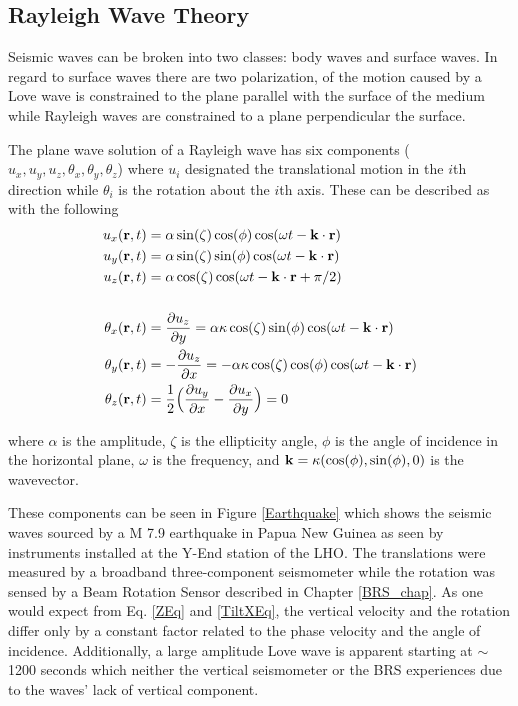 \documentclass [12pt, proquest]{uwthesis}[2019]
\begin{document}
\subsection{Rayleigh Wave Theory}

Seismic waves can be broken into two classes: body waves and surface waves. In regard to surface waves there are two polarization, of the motion caused by a Love wave is constrained to the plane parallel with the surface of the medium while Rayleigh waves are constrained to a plane perpendicular the surface. 

The plane wave solution of a Rayleigh wave has six components ($u_x, u_y, u_z, \theta_x, \theta_y, \theta_z$) where $u_i$ designated the translational motion in the $i$th direction while $\theta_i$ is the rotation about the $i$th axis.
These can be described as with the following \cite{seismic}
\begin{align}
u_x({\bf r} ,t)&=\alpha \sin(\zeta) \cos(\phi) \cos(\omega t-{\bf k}\cdot{\bf r})\label{XEq}\\
u_y({\bf r} ,t)&=\alpha \sin(\zeta) \sin(\phi) \cos(\omega t-{\bf k}\cdot{\bf r})\\
u_z({\bf r} ,t)&=\alpha \cos(\zeta) \cos(\omega t-{\bf k}\cdot{\bf r}+\pi/2)\label{ZEq}\\
\notag \\
\theta_x({\bf r} ,t)&=\frac{\partial u_z}{\partial y}=\alpha \kappa \cos(\zeta) \sin(\phi) \cos(\omega t-{\bf k}\cdot{\bf r})\label{TiltXEq}\\
\theta_y({\bf r} ,t)&=-\frac{\partial u_z}{\partial x}=-\alpha \kappa \cos(\zeta) \cos(\phi) \cos(\omega t-{\bf k}\cdot{\bf r})\\
\theta_z({\bf r} ,t)&=\frac{1}{2}\Big(\frac{\partial u_y}{\partial x}-\frac{\partial u_x}{\partial y}\Big)=0
\end{align}

where $\alpha$ is the amplitude, $\zeta$ is the ellipticity angle, $\phi$ is the angle of incidence in the horizontal plane, $\omega$ is the frequency, and $\bf{k}=\kappa (\cos(\phi),\sin(\phi),\text{0})$ is the wavevector.

These components can be seen in Figure \ref{Earthquake} which shows the seismic waves sourced by a M 7.9 earthquake in Papua New Guinea as seen by instruments installed at the Y-End station of the LHO. The translations were measured by a broadband three-component seismometer while the rotation was sensed by a Beam Rotation Sensor described in Chapter \ref{BRS_chap}. As one would expect from Eq. \ref{ZEq} and \ref{TiltXEq}, the vertical velocity and the rotation differ only by a constant factor related to the phase velocity and the angle of incidence. Additionally, a large amplitude Love wave is apparent starting at $\sim$ 1200 seconds which neither the vertical seismometer or the BRS experiences due to the waves' lack of vertical component.
\end{document}
